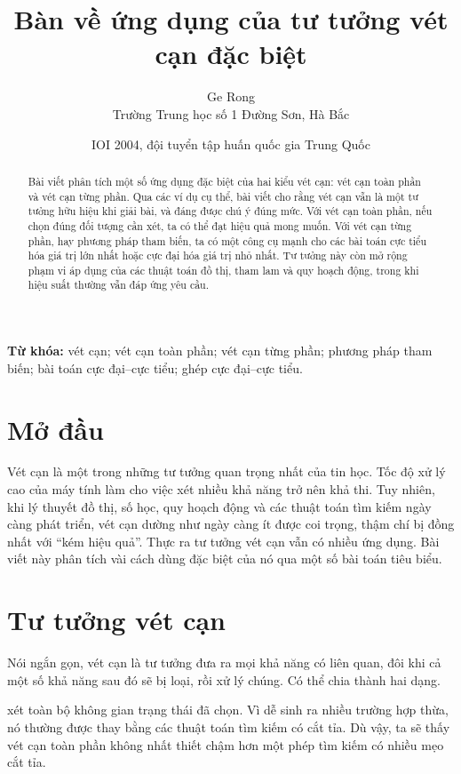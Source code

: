 \documentclass[11pt]{article}
\title{Bàn về ứng dụng của tư tưởng vét cạn đặc biệt}
\author{Ge Rong\\Trường Trung học số 1 Đường Sơn, Hà Bắc}
\date{IOI 2004, đội tuyển tập huấn quốc gia Trung Quốc}
\begin{document}
\maketitle


\begin{abstract}
Bài viết phân tích một số ứng dụng đặc biệt của hai kiểu vét cạn: vét cạn
toàn phần và vét cạn từng phần. Qua các ví dụ cụ thể, bài viết cho rằng vét
cạn vẫn là một tư tưởng hữu hiệu khi giải bài, và đáng được chú ý đúng mức.
Với vét cạn toàn phần, nếu chọn đúng đối tượng cần xét, ta có thể đạt hiệu
quả mong muốn. Với vét cạn từng phần, hay phương pháp tham biến, ta có một
công cụ mạnh cho các bài toán cực tiểu hóa giá trị lớn nhất hoặc cực đại hóa
giá trị nhỏ nhất. Tư tưởng này còn mở rộng phạm vi áp dụng của các thuật toán
đồ thị, tham lam và quy hoạch động, trong khi hiệu suất thường vẫn đáp ứng
yêu cầu.
\end{abstract}

\noindent\textbf{Từ khóa:} vét cạn; vét cạn toàn phần; vét cạn từng phần;
phương pháp tham biến; bài toán cực đại--cực tiểu; ghép cực đại--cực tiểu.

\section{Mở đầu}

Vét cạn là một trong những tư tưởng quan trọng nhất của tin học. Tốc độ xử lý
cao của máy tính làm cho việc xét nhiều khả năng trở nên khả thi. Tuy nhiên,
khi lý thuyết đồ thị, số học, quy hoạch động và các thuật toán tìm kiếm ngày
càng phát triển, vét cạn dường như ngày càng ít được coi trọng, thậm chí bị
đồng nhất với ``kém hiệu quả''. Thực ra tư tưởng vét cạn vẫn có nhiều ứng
dụng. Bài viết này phân tích vài cách dùng đặc biệt của nó qua một số bài
toán tiêu biểu.

\section{Tư tưởng vét cạn}

Nói ngắn gọn, vét cạn là tư tưởng đưa ra mọi khả năng có liên quan, đôi khi
cả một số khả năng sau đó sẽ bị loại, rồi xử lý chúng. Có thể chia thành hai
dạng.

 xét toàn bộ không gian trạng thái đã chọn. Vì dễ sinh
ra nhiều trường hợp thừa, nó thường được thay bằng các thuật toán tìm kiếm có
cắt tỉa. Dù vậy, ta sẽ thấy vét cạn toàn phần không nhất thiết chậm hơn một
phép tìm kiếm có nhiều mẹo cắt tỉa.
\end{document}
